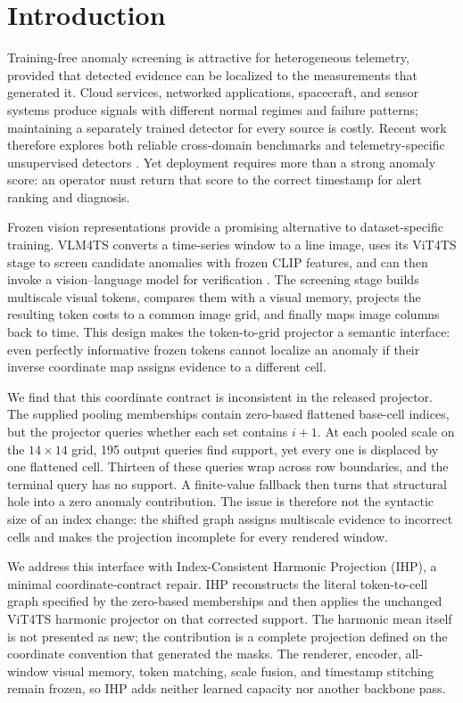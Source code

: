 \section{Introduction}

Training-free anomaly screening is attractive for heterogeneous telemetry,
provided that detected evidence can be localized to the measurements that
generated it. Cloud services, networked applications, spacecraft, and sensor
systems produce signals with different normal regimes and failure patterns;
maintaining a separately trained detector for every source is costly. Recent
work therefore explores both reliable cross-domain benchmarks
\cite{liu2024elephant} and telemetry-specific unsupervised detectors
\cite{dong2025blade}. Yet deployment requires more than a strong anomaly
score: an operator must return that score to the correct timestamp for alert
ranking and diagnosis.

Frozen vision representations provide a promising alternative to
dataset-specific training. VLM4TS converts a time-series window to a line
image, uses its ViT4TS stage to screen candidate anomalies with frozen CLIP
features, and can then invoke a vision--language model for verification
\cite{he2026vlm4ts,radford2021clip}. The screening stage builds multiscale
visual tokens, compares them with a visual memory, projects the resulting
token costs to a common image grid, and finally maps image columns back to
time. This design makes the token-to-grid projector a semantic interface:
even perfectly informative frozen tokens cannot localize an anomaly if their
inverse coordinate map assigns evidence to a different cell.

We find that this coordinate contract is inconsistent in the released
projector. The supplied pooling memberships contain zero-based flattened
base-cell indices, but the projector queries whether each set contains
$i+1$. At each pooled scale on the $14\times14$ grid, 195 output queries find
support, yet every one is displaced by one flattened cell. Thirteen of these
queries wrap across row boundaries, and the terminal query has no support. A
finite-value fallback then turns that structural hole into a zero anomaly
contribution. The issue is therefore not the syntactic size of an index
change: the shifted graph assigns multiscale evidence to incorrect cells and
makes the projection incomplete for every rendered window.

We address this interface with Index-Consistent Harmonic Projection (IHP), a
minimal coordinate-contract repair. IHP reconstructs the literal
token-to-cell graph specified by the zero-based memberships and then applies
the unchanged ViT4TS harmonic projector on that corrected support. The
harmonic mean itself is not presented as new; the contribution is a complete
projection defined on the coordinate convention that generated the masks.
The renderer, encoder, all-window visual memory, token matching, scale fusion,
and timestamp stitching remain frozen, so IHP adds neither learned capacity
nor another backbone pass.

